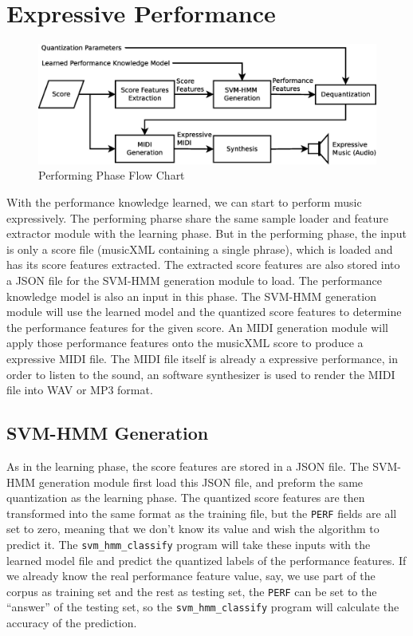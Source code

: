    \section{Expressive Performance}
   \begin{figure}[tp]
      \begin{center}
         \includegraphics[width=\textwidth]{fig/perf_arch}
      \end{center}
      \caption{Performing Phase Flow Chart} 
      \label{fig:perfflow}
   \end{figure}
With the performance knowledge learned, we can start to perform music expressively. The performing pharse share the same sample loader and feature extractor module with the learning phase. But in the performing phase, the input is only a score file (musicXML containing a single phrase), which is loaded and has its score features extracted. The extracted score features are also stored into a JSON file for the SVM-HMM generation module to load. The performance knowledge model is also an input in this phase. The SVM-HMM generation module will use the learned model and the quantized score features to determine the performance features for the given score. An MIDI generation module will apply those performance features onto the musicXML score to produce a expressive MIDI file. The MIDI file itself is already a expressive performance, in order to listen to the sound, an software synthesizer is used to render the MIDI file into WAV or MP3 format.
\subsection{SVM-HMM Generation}
As in the learning phase, the score features are stored in a JSON file. The SVM-HMM generation module first load this JSON file, and preform the same quantization as the learning phase. The quantized score features are then transformed into the same format as the training file, but the \texttt{PERF} fields are all set to zero, meaning that we don't know its value and wish the algorithm to predict it. The \texttt{svm\_hmm\_classify} program will take these inputs with the learned model file and predict the quantized labels of the performance features. If we already know the real performance feature value, say, we use part of the corpus as training set and the rest as testing set, the \texttt{PERF} can be set to the \enquote{answer} of the testing set, so the \texttt{svm\_hmm\_classify} program will calculate the accuracy of the prediction. 

